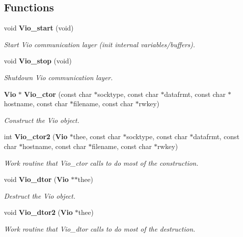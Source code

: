 \subsection*{Functions}
\begin{DoxyCompactItemize}
\item 
void {\bf Vio\_\-start} (void)
\begin{DoxyCompactList}\small\item\em Start Vio communication layer (init internal variables/buffers). \item\end{DoxyCompactList}\item 
void {\bf Vio\_\-stop} (void)
\begin{DoxyCompactList}\small\item\em Shutdown Vio communication layer. \item\end{DoxyCompactList}\item 
{\bf Vio} $\ast$ {\bf Vio\_\-ctor} (const char $\ast$socktype, const char $\ast$datafrmt, const char $\ast$hostname, const char $\ast$filename, const char $\ast$rwkey)
\begin{DoxyCompactList}\small\item\em Construct the Vio object. \item\end{DoxyCompactList}\item 
int {\bf Vio\_\-ctor2} ({\bf Vio} $\ast$thee, const char $\ast$socktype, const char $\ast$datafrmt, const char $\ast$hostname, const char $\ast$filename, const char $\ast$rwkey)
\begin{DoxyCompactList}\small\item\em Work routine that Vio\_\-ctor calls to do most of the construction. \item\end{DoxyCompactList}\item 
void {\bf Vio\_\-dtor} ({\bf Vio} $\ast$$\ast$thee)
\begin{DoxyCompactList}\small\item\em Destruct the Vio object. \item\end{DoxyCompactList}\item 
void {\bf Vio\_\-dtor2} ({\bf Vio} $\ast$thee)
\begin{DoxyCompactList}\small\item\em Work routine that Vio\_\-dtor calls to do most of the destruction. \item\end{DoxyCompactList}\item 
$$
\end{DoxyCompactItemize}
